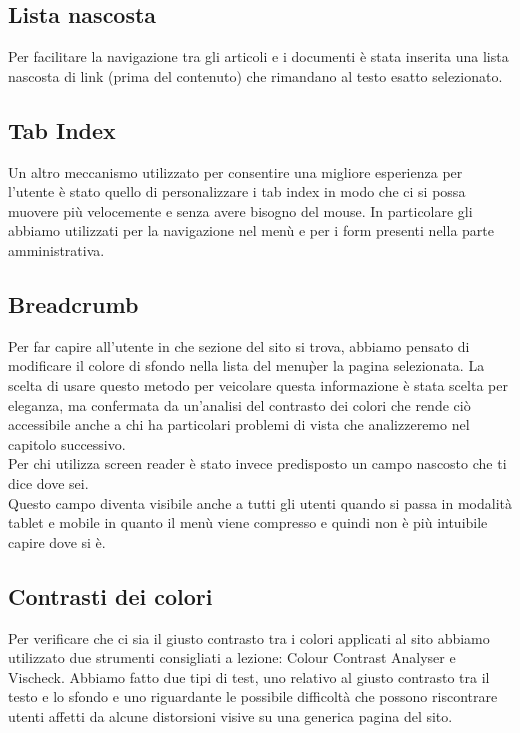 \subsection{Lista nascosta}
Per facilitare la navigazione tra gli articoli e i documenti \`e stata inserita una lista nascosta di link (prima del contenuto) che rimandano al testo esatto selezionato.

\subsection{Tab Index}
Un altro meccanismo utilizzato per consentire una migliore esperienza per l'utente \`e stato quello di personalizzare i tab index in modo che ci si possa muovere pi\`u velocemente e senza avere bisogno del mouse.
In particolare gli abbiamo utilizzati per la navigazione nel men\`u e per i form presenti nella parte amministrativa.

\subsection{Breadcrumb}
Per far capire all'utente in che sezione del sito si trova, abbiamo pensato di modificare il colore di sfondo nella lista del menu\`per la pagina selezionata. La scelta di usare questo metodo  per veicolare questa informazione \`e stata scelta per eleganza, ma confermata da un'analisi del contrasto dei colori che rende ci\`o accessibile anche a chi ha particolari problemi di vista che analizzeremo nel capitolo successivo.
\\  Per chi utilizza screen reader è stato invece predisposto un campo nascosto che ti dice dove sei.
\\ Questo campo diventa visibile anche a tutti gli utenti quando si passa in modalità tablet e mobile in quanto il men\`u viene compresso e quindi non \`e pi\`u intuibile capire dove si \`e.

\subsection{Contrasti dei colori}
Per verificare che ci sia il giusto contrasto tra i colori applicati al sito abbiamo utilizzato due strumenti consigliati a lezione: Colour Contrast Analyser e Vischeck.
Abbiamo fatto due tipi di test, uno relativo al giusto contrasto tra il testo e lo sfondo e uno riguardante le possibile difficolt\`a che possono riscontrare utenti affetti da alcune distorsioni visive su una generica pagina del sito.
